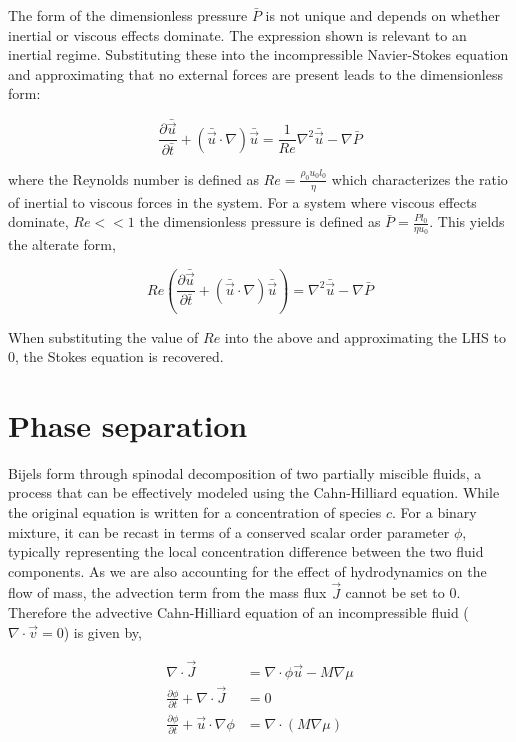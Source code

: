 The form of the dimensionless pressure $\bar{P}$ is not unique and depends on whether inertial or viscous effects dominate. The expression shown is 
relevant to an inertial regime. Substituting these into the incompressible Navier-Stokes equation and approximating that no external forces are present 
leads to the dimensionless form:

\begin{equation}
    \frac{\partial \bar{\vec{u}}}{\partial \bar{t}} + (\bar{\vec{u}} \cdot\nabla)\bar{\vec{u}} = \frac{1}{Re} \nabla^2 \bar{\vec{u}} - \nabla\bar{P}
\end{equation}

where the Reynolds number is defined as $Re = \frac{\rho_0 u_0 l_0}{\eta}$ which characterizes the ratio of inertial to viscous forces in the system. For a system
where viscous effects dominate, $Re << 1$ the dimensionless pressure is defined as $\bar{P} = \frac{P l_0}{\eta u_0}$. This yields the alterate form,

\begin{equation}
    Re\left( \frac{\partial \bar{\vec{u}}}{\partial \bar{t}} + (\bar{\vec{u}} \cdot\nabla)\bar{\vec{u}}  \right) = \nabla^2 \bar{\vec{u}} - \nabla\bar{P}
\end{equation}

When substituting the value of $Re$ into the above and approximating the LHS to 0, the Stokes equation is recovered.

\section{Phase separation}

Bijels form through spinodal decomposition of two partially miscible fluids, a process that can be effectively modeled using the Cahn-Hilliard equation. \cite{cahn_spinodal_1961} While the
original equation is written for a concentration of species $c$. For a binary mixture, it can be recast in terms of a conserved scalar order parameter $\phi$, typically representing the 
local concentration difference between the two fluid components. As we are also accounting for the effect of hydrodynamics on the flow of mass, the advection term
from the mass flux $\vec{J}$ cannot be set to 0. Therefore the advective Cahn-Hilliard equation of an incompressible fluid ($\nabla \cdot \vec{v} = 0$) is given by,

\begin{equation}
    \begin{split}
        \nabla \cdot \vec{J} &= \nabla \cdot \phi\vec{u} - M \nabla \mu \\
        \frac{\partial \phi}{\partial t} + \nabla \cdot \vec{J} &= 0 \\
        \frac{\partial \phi}{\partial t} + \vec{u}\cdot\nabla\phi &= \nabla \cdot \left( M \nabla \mu \right)
    \end{split}
\end{equation}

